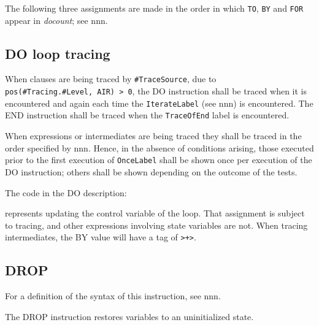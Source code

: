 

The following three assignments are made in the order in which
\texttt{\textquotesingle{}TO\textquotesingle{}},
\texttt{\textquotesingle{}BY\textquotesingle{}} and
\texttt{\textquotesingle{}FOR\textquotesingle{}} appear in
\emph{docount}; see nnn.



\subsection{DO loop tracing}\label{do-loop-tracing}

When clauses are being traced by \texttt{\#TraceSource}, due to
\texttt{pos(\#Tracing.\#Level,\ \textquotesingle{}AIR\textquotesingle{})\ \textgreater{}\ 0},
the DO instruction shall be traced when it is encountered and again each
time the \texttt{IterateLabel} (see nnn) is encountered. The END
instruction shall be traced when the \texttt{TraceOfEnd} label is
encountered.

When expressions or intermediates are being traced they shall be traced
in the order specified by nnn. Hence, in the absence of conditions
arising, those executed prior to the first execution of
\texttt{OnceLabel} shall be shown once per execution of the DO
instruction; others shall be shown depending on the outcome of the
tests.

The code in the DO description:



represents updating the control variable of the loop. That assignment is
subject to tracing, and other expressions involving state variables are
not. When tracing intermediates, the BY value will have a tag of
\texttt{\textquotesingle{}\textgreater{}+\textgreater{}\textquotesingle{}}.

\subsection{DROP}\label{drop}

For a definition of the syntax of this instruction, see nnn.

The DROP instruction restores variables to an uninitialized state.

